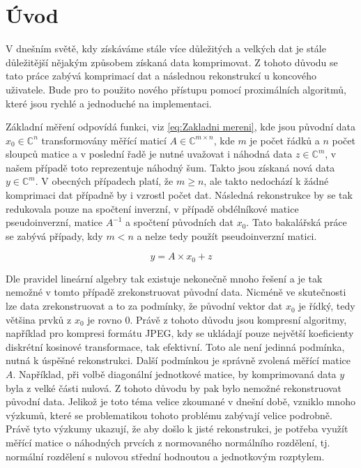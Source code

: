 \documentclass[FM,BP]{tulthesis}
\newcounter{Vzorce}
\begin{document}
\pagebreak

\renewcommand{\baselinestretch}{1.5}
\setlength\parindent{1.2cm}
\selectfont

\chapter{Úvod}
\label{ch:uvod}
 V dnešním světě, kdy získáváme stále více důležitých a velkých dat je stále důležitější nějakým způsobem získaná data komprimovat. Z tohoto důvodu se tato práce zabývá komprimací dat a následnou rekonstrukcí u koncového uživatele. Bude pro to použito nového přístupu pomocí proximálních algoritmů, které jsou rychlé a jednoduché na implementaci.

Základní měření odpovídá funkci, viz \ref{eq:Zakladni mereni}, kde jsou původní data $x_0 \in \mathbb{C}^n$ transformovány měřící maticí $A \in \mathbb{C} ^{m \times n}$, kde $m$ je počet řádků a $n$ počet sloupců matice a v poslední řadě je nutné uvažovat i náhodná data $z \in \mathbb{C}^m$, v našem případě toto reprezentuje náhodný šum. Takto jsou získaná nová data $y \in \mathbb{C}^m$. V obecných případech platí, že $m \geq n$, ale takto nedochází k žádné komprimaci dat případně by i vzrostl počet dat. Následná rekonstrukce by se tak redukovala pouze na spočtení inverzní, v případě obdélníkové matice pseudoinverzní, matice $A^{-1}$ a spočtení původních dat $x_0$. Tato bakalářská práce se zabývá případy, kdy $m < n$ a nelze tedy použít pseudoinverzní matici.

\begin{equation} \label{eq:Zakladni mereni} \tag{Vzorec \theVzorce}
y = A \times x_0 + z
\end{equation}

Dle pravidel lineární algebry tak existuje nekonečně mnoho řešení a je tak nemožné v tomto případě zrekonstruovat původní data. Nicméně ve skutečnosti lze data zrekonstruovat a to za podmínky, že původní vektor dat $x_0$ je řídký, tedy většina prvků z $x_0$ je rovno $0$. Právě z tohoto důvodu jsou kompresní algoritmy, například pro kompresi formátu JPEG, kdy se ukládají pouze největší koeficienty diskrétní kosinové transformace, tak efektivní. Toto ale není jedinná podmínka, nutná k úspěšné rekonstrukci. Další podmínkou je správně zvolená měřící matice $A$. Například, při volbě diagonální jednotkové matice, by komprimovaná data $y$ byla z velké části nulová. Z tohoto důvodu by pak bylo nemožné rekonstruovat původní data. Jelikož je toto téma velice zkoumané v dnešní době, vzniklo mnoho výzkumů, které se problematikou tohoto problému zabývají velice podrobně. Právě tyto výzkumy ukazují, že aby došlo k jisté rekonstrukci, je potřeba využít měřící matice o náhodných prvcích z normovaného normálního rozdělení, tj. normální rozdělení s nulovou střední hodnoutou a jednotkovým rozptylem.
\end{document}
